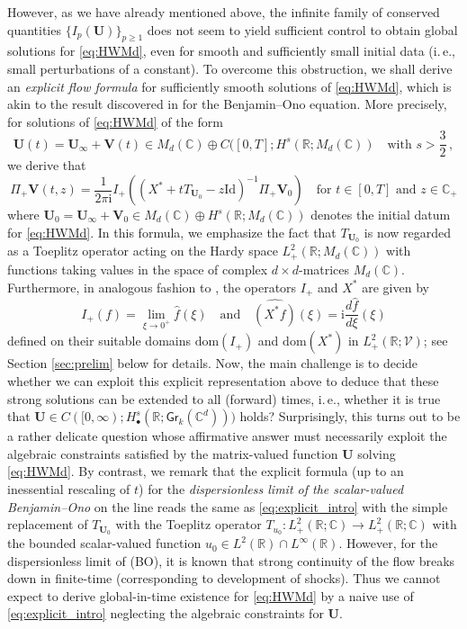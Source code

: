\documentclass[11pt,reqno]{amsart}
\theoremstyle{definition}
\theoremstyle{remark}
\theoremstyle{remark}
\numberwithin{equation}{section}
\newcommand{\C}{\mathbb{C}}
\newcommand{\R}{\mathbb{R}}
\newcommand{\VV}{\mathcal{V}}
\newcommand{\dom}{\mathrm{dom}}
\newcommand{\be}{\begin{equation}}
\newcommand{\ee}{\end{equation}}
\newcommand{\ii}{\mathrm{i}}
\newcommand{\Vb}{\mathbf{V}}
\newcommand{\Ub}{\mathbf{U}}
\newcommand{\id}{\mathrm{Id}}
\newcommand{\Gr}{\mathsf{Gr}}
\begin{document}
\medskip
However, as we have already mentioned above, the infinite family of conserved quantities $\{ I_p(\Ub) \}_{p \geq 1}$ does not seem to yield sufficient control to obtain global solutions for \eqref{eq:HWMd}, even for smooth and sufficiently small initial data (i.\,e., small perturbations of a constant). To overcome this obstruction, we shall  derive an {\em explicit flow formula} for sufficiently smooth solutions of \eqref{eq:HWMd}, which is akin to the result  discovered in \cite{Ge-23} for the Benjamin--Ono equation. More precisely, for solutions of \eqref{eq:HWMd} of the form
$$ 
\Ub(t) = \Ub_\infty + \Vb(t) \in M_d(\C) \oplus C([0,T]; H^s(\R; M_d(\C)) \quad \mbox{with $s > \frac{3}{2}$} \, ,
$$  
we derive that 
\be \label{eq:explicit_intro}
\boxed{\Pi_+ \Vb(t,z) = \frac{1}{2\pi \ii} I_+ \left ( (X^* + t T_{\Ub_0} -z \id)^{-1} \Pi_+ \Vb_0  \right ) \quad \mbox{for $t \in [0,T]$ and $z \in \C_+$}} 
\ee
where $\Ub_0 = \Ub_\infty + \Vb_0 \in M_d(\C) \oplus H^s(\R; M_d(\C))$ denotes the initial datum for \eqref{eq:HWMd}. In this formula, we emphasize the fact that $T_{\Ub_0}$ is now regarded as a Toeplitz operator acting on the Hardy space $L^2_+(\R; M_d(\C))$ with functions taking values in the space of complex $d \times d$-matrices $M_d(\C)$. Furthermore, in analogous fashion to \cite{Ge-23}, the operators $I_+$ and $X^*$ are given by
$$
I_+(f) = \lim_{\xi \to 0^+} \widehat{f}(\xi) \quad \mbox{and} \quad \widehat{(X^* f)}(\xi) = \ii \frac{d \widehat{f}}{d \xi}(\xi)
$$
defined on their suitable domains $\dom(I_+)$ and $\dom(X^*)$ in $L^2_+(\R;\VV)$; see Section \ref{sec:prelim} below for details. Now, the main challenge is to decide whether we can exploit this explicit representation above to deduce that these strong solutions can be extended to all (forward) times, i.\,e., whether it is true that $\Ub \in C([0,\infty); H^s_\bullet(\R; \Gr_k(\C^d)))$ holds? Surprisingly, this turns out to be a rather delicate question whose affirmative answer must  necessarily exploit the algebraic constraints satisfied by the matrix-valued function $\Ub$ solving \eqref{eq:HWMd}. By contrast, we remark that the explicit formula (up to an inessential rescaling of $t$) for the {\em dispersionless limit of the scalar-valued Benjamin--Ono} on the line reads the same as \eqref{eq:explicit_intro} with the simple replacement of $T_{\Ub_0}$ with the Toeplitz operator $T_{u_0} : L^2_+(\R;\C) \to L^2_+(\R; \C)$ with the bounded scalar-valued function $u_0 \in L^2(\R) \cap L^\infty(\R)$. However, for the dispersionless limit of (BO), it is known \cite{Ge-24c} that strong continuity of the flow breaks down in finite-time (corresponding to development of shocks). Thus we cannot expect to derive global-in-time existence for \eqref{eq:HWMd} by a naive use of \eqref{eq:explicit_intro} neglecting the algebraic constraints for $\Ub$.
\end{document}
